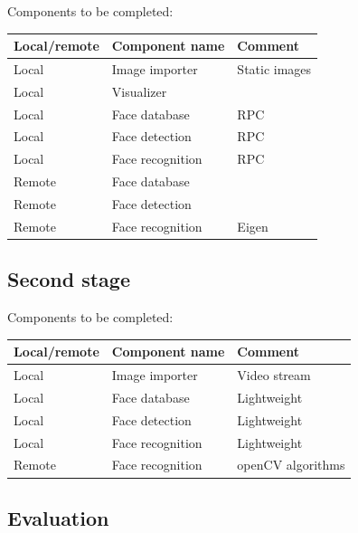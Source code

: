 \documentclass[conference]{IEEEtran}
\begin{document}
Components to be completed:
\begin{center}
\begin{tabular}{|l||l|l|}
	\hline
	\bf Local/remote & \bf Component name & \bf Comment \\
	\hline \hline
	Local & Image importer 	& Static images \\		\hline
	Local & Visualizer 		&  \\       \hline
	Local & Face database	& RPC \\   \hline
	Local & Face detection 	& RPC \\   \hline
	Local & Face recognition & RPC \\  \hline
	Remote & Face database	&  \\     \hline
	Remote & Face detection &  \\     \hline
	Remote & Face recognition & Eigen \\    \hline
	\hline
\end{tabular}
\end{center}


\subsection{Second stage}

Components to be completed:
\begin{center}
\begin{tabular}{|l||l|l|}
	\hline
	\bf Local/remote & \bf Component name & \bf Comment \\
	\hline \hline
	Local & Image importer 	& Video stream \\		\hline
	Local & Face database	& Lightweight \\   \hline
	Local & Face detection 	& Lightweight \\   \hline
	Local & Face recognition & Lightweight \\  \hline
	Remote & Face recognition & openCV algorithms \\    \hline
	\hline
\end{tabular}
\end{center}

\subsection{Evaluation}
\end{document}
